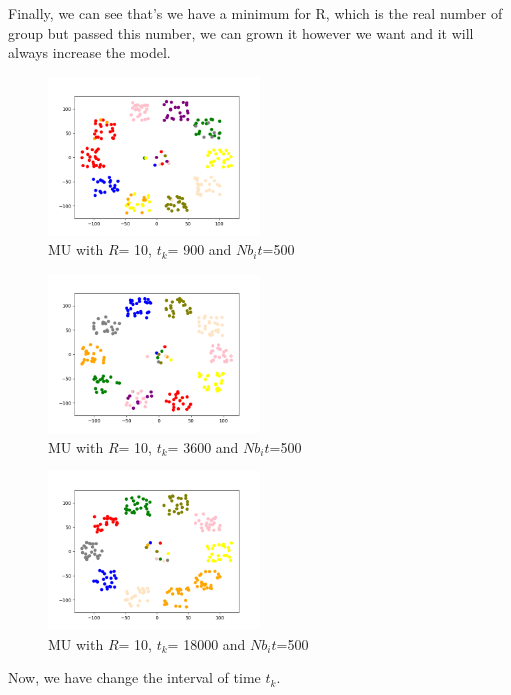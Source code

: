 \documentclass{article}
\begin{document}
Finally, we can see that's we have a minimum for R, which is the real number of group but passed this number, we can grown it however we want and it will always increase the model.

\begin{figure}[h]
    \centering
    \includegraphics[width=0.5\textwidth]{images/MU500_R10_t900.png}
    \caption{MU with $R$= 10, $t_{k}$= 900 and $Nb_it$=500}

\end{figure}

\begin{figure}[h]
    \centering
    \includegraphics[width=0.5\textwidth]{images/MU500_R10_t3600.png}
    \caption{MU with $R$= 10, $t_{k}$= 3600 and $Nb_it$=500}

\end{figure}

\begin{figure}[h]
    \centering
    \includegraphics[width=0.5\textwidth]{images/MU500_R10_t18000.png}
    \caption{MU with $R$= 10, $t_{k}$= 18000 and $Nb_it$=500}

\end{figure}

Now, we have change the interval of time $t_{k}$.\\


    
\end{document}
